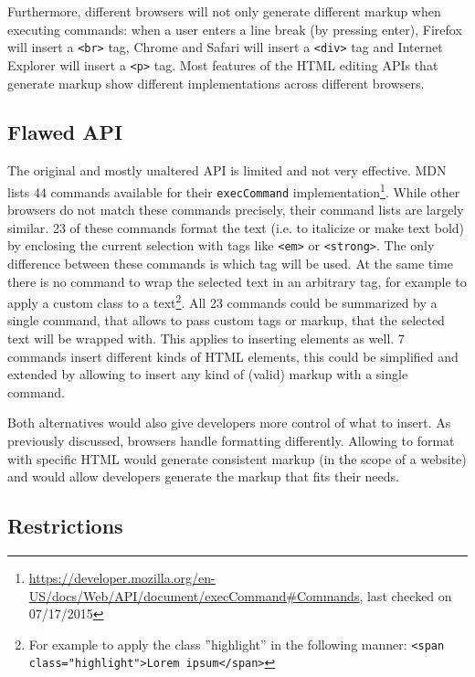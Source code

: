 Furthermore, different browsers will not only generate different markup when executing commands: when a user enters a line break (by pressing enter), Firefox will insert a \texttt{<br>} tag, Chrome and Safari will insert a \texttt{<div>} tag and Internet Explorer will insert a \texttt{<p>} tag. Most features of the HTML editing APIs that generate markup show different implementations across different browsers.


\subsection{Flawed API} 
\label{subsec:flawed_api}

The original and mostly unaltered API is limited and not very effective. MDN lists 44 commands available for their \texttt{execCommand} implementation\footnote{\url{https://developer.mozilla.org/en-US/docs/Web/API/document/execCommand\#Commands}, last checked on 07/17/2015}. While other browsers do not match these commands precisely, their command lists are largely similar. 23 of these commands format the text (i.e. to italicize or make text bold) by enclosing the current selection with tags like \texttt{<em>} or \texttt{<strong>}. The only difference between these commands is which tag will be used. At the same time there is no command to wrap the selected text in an arbitrary tag, for example to apply a custom class to a text\footnote{For example to apply the  class ''highlight'' in the following manner: \texttt{<span class="highlight">Lorem ipsum</span>}}. All 23 commands could be summarized by a single command, that allows to pass custom tags or markup, that the selected text will be wrapped with. This applies to inserting elements as well. 7 commands insert different kinds of HTML elements, this could be simplified and extended by allowing to insert any kind of (valid) markup with a single command. 


Both alternatives would also give developers more control of what to insert. As previously discussed, browsers handle formatting differently. Allowing to format with specific HTML would generate consistent markup (in the scope of a website) and would allow developers generate the markup that fits their needs.


\subsection{Restrictions}


